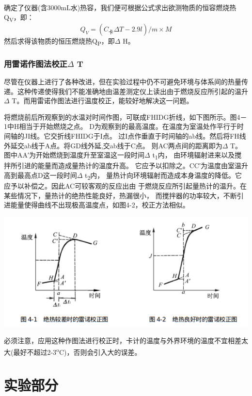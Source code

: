 \documentclass[11pt]{report}
\begin{document}
确定了仪器(含3000mL水)热容，我们便可根据公式求出欲测物质的恒容燃烧热Q\textsubscript{V}，即：
\[
    Q_{V}=(C_{卡}\Delta T-2.9l)/m\times M
    \]
然后求得该物质的恒压燃烧热Q\textsubscript{P}，即\(\Delta\) H。

\section{用雷诺作图法校正\(\Delta\) T}
\label{sec:org0f435e4}

尽管在仪器上进行了各种改进，但在实验过程中仍不可避免环境与体系间的热量传递。这种传递使得我们不能准确地由温差测定仪上读出由于燃烧反应所引起的温升\(\Delta\) T。而用雷诺作图法进行温度校正，能较好地解决这一问题。

将燃烧前后所观察到的水温对时间作图，可联成FHIDG折线，如下图所示。图4－1中H相当于开始燃烧之点。
D为观察到的最高温度。在温度为室温处作平行于时间轴的JI线。它交折线FHIDG于I点。
过I点作垂直于时间轴的ab线。然后将FH线外延交ab线于A点。将GD线外延,交ab线于C点。
则AC两点间的距离即为\(\Delta\) T。图中AA′为开始燃烧到温度升至室温这一段时间\(\Delta\) t\textsubscript{1}内，
由环境辐射进来以及搅拌所引进的能量而造成量热计的温度升高。
它应予以扣除之。CC′为温度由室温升高到最高点D这一段时间\(\Delta\) t\textsubscript{2}内，
量热计向环境辐射而造成本身温度的降低。它应予以补偿之。因此AC可较客观的反应出由
于燃烧反应所引起量热计的温升。在某些情况下，量热计的绝热性能良好，热漏很小，
而搅拌器的功率较大，不断引进能量使得曲线不出现极高温度点，如图4-2，校正方法相似。

\begin{center}
\includegraphics[width=.9\linewidth]{../img/1.png}
\end{center}

必须注意，应用这种作图法进行校正时，卡计的温度与外界环境的温度不宜相差太大(最好不超过2-3\textsuperscript{o}C)，否则会引入大的误差。

\part{实验部分}
\label{sec:org321dc3e}
\end{document}
